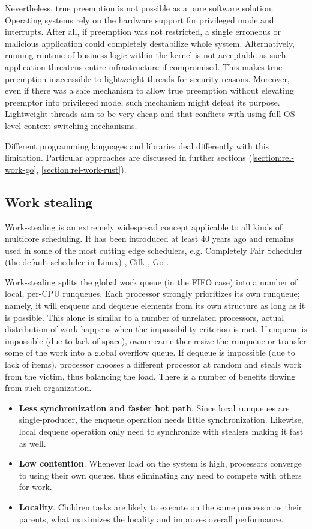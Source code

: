\documentclass[12pt,a4paper,twoside]{report}
\begin{document}
Nevertheless, true preemption is not possible as a pure software solution. Operating systems rely on the hardware support for privileged mode and interrupts. After all, if preemption was not restricted, a single erroneous or malicious application could completely destabilize whole system. Alternatively, running runtime of business logic within the kernel is not acceptable as such application threatens entire infrastructure if compromised. This makes true preemption inaccessible to lightweight threads for security reasons. Moreover, even if there was a safe mechanism to allow true preemption without elevating preemptor into privileged mode, such mechanism might defeat its purpose. Lightweight threads aim to be very cheap and that conflicts with using full OS-level context-switching mechanisms.

Different programming languages and libraries deal differently with this limitation. Particular approaches are discussed in further sections (\ref{section:rel-work-go}, \ref{section:rel-work-rust}).

\subsection{Work stealing}
\label{section:background-work-stealing}
Work-stealing is an extremely widespread concept applicable to all kinds of multicore scheduling. It has been introduced at least 40 years ago \cite{Blumofe1999} and remains used in some of the most cutting edge schedulers, e.g. Completely Fair Scheduler (the default scheduler in Linux) \cite{linux_cfs}, Cilk \cite{Blumofe1995}, Go \cite{golang}.

Work-stealing splits the global work queue (in the FIFO case) into a number of local, per-CPU runqueues. Each processor strongly prioritizes its own runqueue; namely, it will enqueue and dequeue elements from its own structure as long as it is possible. This alone is similar to a number of unrelated processors, actual distribution of work happens when the impossibility criterion is met. If enqueue is impossible (due to lack of space), owner can either resize the runqueue or transfer some of the work into a global overflow queue. If dequeue is impossible (due to lack of items), processor chooses a different processor at random and steals work from the victim, thus balancing the load. There is a number of benefits flowing from such organization. \begin{itemize}
    \item \textbf{Less synchronization and faster hot path}. Since local runqueues are single-producer, the enqueue operation needs little synchronization. Likewise, local dequeue operation only need to synchronize with stealers making it fast as well. 
    \item \textbf{Low contention}. Whenever load on the system is high, processors converge to using their own queues, thus eliminating any need to compete with others for work.
    \item \textbf{Locality}. Children tasks are likely to execute on the same processor as their parents, what maximizes the locality and improves overall performance.
\end{itemize}
\end{document}

